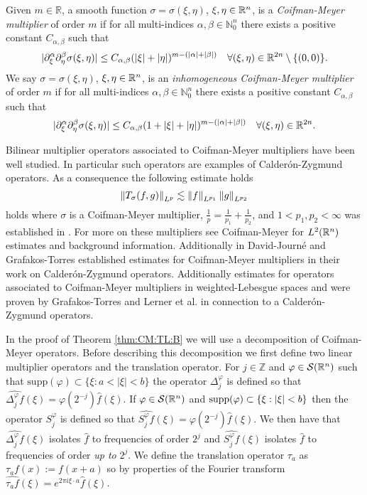 {\begin{dfn}\label{CM_def}
Given $m\in\mathbb{R}$, a smooth function $\sigma = \sigma(\xi,\eta)$, $\xi,\eta\in{{\mathbb R}^n}$, is a \textit{Coifman-Meyer multiplier} of order $m$ if for all multi-indices $\alpha,\beta\in\mathbb{N}^n_0$ there exists a positive constant $C_{\alpha,\beta}$ such that 
\begin{equation}\label{eq:CMm}
|\partial_\xi^\alpha \partial_\eta^\beta \sigma(\xi, \eta)| \leq C_{\alpha, \beta} (|\xi|+|\eta|)^{m -(\left\vert \alpha \right\vert+ \left\vert \beta \right\vert)} \quad \forall (\xi, \eta) \in \mathbb{R}^{2n} \setminus \{(0,0)\}.
\end{equation}
We say $\sigma = \sigma(\xi,\eta)$, $\xi,\eta\in{{\mathbb R}^n}$, is an \textit{inhomogeneous Coifman-Meyer multiplier} of order $m$ if for all multi-indices $\alpha,\beta\in\mathbb{N}^n_0$ there exists a positive constant $C_{\alpha,\beta}$ such that 
\begin{equation}\label{eq:CMm}
|\partial_\xi^\alpha \partial_\eta^\beta \sigma(\xi, \eta)| \leq C_{\alpha, \beta} (1+|\xi|+|\eta|)^{m -(\left\vert \alpha \right\vert+ \left\vert \beta \right\vert)} \quad \forall (\xi, \eta) \in \mathbb{R}^{2n}.
\end{equation}
\end{dfn}
Bilinear multiplier operators associated to Coifman-Meyer multipliers have been well studied. In particular such operators are examples of Calder\'on-Zygmund operators. As a consequence the following estimate holds 
\[ \left\|T_\sigma(f,g)\right\|_{L^p}\lesssim \left\|f\right\|_{L^{p_1}}\left\|g\right\|_{L^{p_2}} \]
holds where $\sigma$ is a Coifman-Meyer multiplier, $\frac{1}{p} = \frac{1}{p_1} + \frac{1}{p_2}$, and $1<p_1,p_2<\infty$ was established in \citep{MR1880324}. For more on these multipliers see Coifman-Meyer \citep{MR518170} for $L^2({{\mathbb R}^n})$ estimates and background information. Additionally in David-Journ\'{e} \cite{MR763911} and Grafakos-Torres \citep{MR1880324} established estimates for Coifman-Meyer multipliers in their work on Calder\'on-Zygmund operators. Additionally estimates for operators associated to Coifman-Meyer multipliers in weighted-Lebesgue spaces and were proven by Grafakos-Torres \citep{MR1947875} and Lerner et al. \citep{MR2483720} in connection to a Calder\'{o}n-Zygmund operators. 	

In the proof of Theorem \ref{thm:CM:TL:B} we will use a decomposition of Coifman-Meyer operators. Before describing this decomposition we first define two linear multiplier operators and the translation operator.
For $j\in\mathbb{Z}$ and $\varphi \in {\mathcal{S}}({{\mathbb R}^n})$ such that $\text{supp}(\varphi) \subset \{\xi : a < |\xi| < b \}$ the operator $\Delta^\varphi_j$ is defined so that $\widehat{\Delta^\varphi_j f}(\xi) = \varphi(2^{-j})\widehat{f}(\xi)$. 
If $\varphi \in {\mathcal{S}}({{\mathbb R}^n})$ and $\text{{\rm{supp}}}(\varphi) \subset \{ \xi : |\xi| < b \}$ then the operator $S^\varphi_j$ is defined so that $\widehat{S^\varphi_j f}(\xi) = \varphi(2^{-j})\widehat{f}(\xi)$.
We then have that $\widehat{\Delta^\varphi_j f}(\xi)$ isolates $\widehat{f}$ to frequencies of order $2^j$ and $\widehat{S^\varphi_j f}(\xi)$ isolates $\widehat{f}$ to frequencies of order \textit{up to} $2^j$. 
We define the translation operator $\tau_a$ as $\tau_a f(x) := f(x+a)$ so by properties of the Fourier transform $\widehat{\tau_a f}(\xi) = e^{2\pi i \xi \cdot a} \widehat{f}(\xi)$.

}
